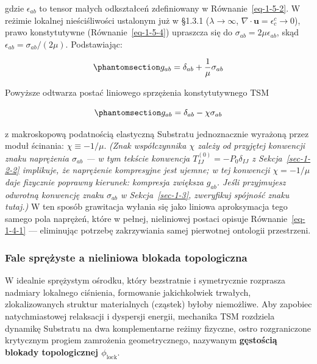 \documentclass[
  polish,
  letterpaper,
  DIV=11,
  numbers=noendperiod,
  oneside]{scrartcl}
\begin{document}
gdzie \(\epsilon_{ab}\) to tensor małych odkształceń zdefiniowany w
Równanie~\ref{eq-1-5-2}. W reżimie lokalnej nieściśliwości ustalonym już
w §1.3.1 (\(\lambda\to\infty\),
\(\nabla\cdot\mathbf{u}=\epsilon^c_c\to0\)), prawo konstytutywne
(Równanie~\ref{eq-1-5-4}) upraszcza się do
\(\sigma_{ab}=2\mu\epsilon_{ab}\), skąd
\(\epsilon_{ab}=\sigma_{ab}/(2\mu)\). Podstawiając:

\begin{equation}\protect\phantomsection\label{eq-1-5-9a}{g_{ab} = \delta_{ab} + \frac{1}{\mu}\sigma_{ab}}\end{equation}

Powyższe odtwarza postać liniowego sprzężenia konstytutywnego TSM

\begin{equation}\protect\phantomsection\label{eq-1-5-9b}{g_{ab} = \delta_{ab} - \chi\sigma_{ab}}\end{equation}

z makroskopową podatnością elastyczną Substratu jednoznacznie wyrażoną
przez moduł ścinania: \(\chi \equiv -1/\mu\). \emph{(Znak współczynnika
\(\chi\) zależy od przyjętej konwencji znaku naprężenia \(\sigma_{ab}\)
--- w tym tekście konwencja \(T^{(0)}_{IJ}=-P_0\delta_{IJ}\) z
Sekcja~\ref{sec-1-2-2} implikuje, że naprężenie kompresyjne jest ujemne;
w tej konwencji \(\chi=-1/\mu\) daje fizycznie poprawny kierunek:
kompresja zwiększa \(g_{ab}\). Jeśli przyjmujesz odwrotną konwencję
znaku \(\sigma_{ab}\) w Sekcja~\ref{sec-1-3}, zweryfikuj spójność znaku
tutaj.)} W ten sposób grawitacja wyłania się jako liniowa aproksymacja
tego samego pola naprężeń, które w pełnej, nieliniowej postaci opisuje
Równanie~\ref{eq-1-4-1} --- eliminując potrzebę zakrzywiania samej
pierwotnej ontologii przestrzeni.

\subsubsection{Fale sprężyste a nieliniowa blokada
topologiczna}\label{sec-1-5-2}

W idealnie sprężystym ośrodku, który bezstratnie i symetrycznie
rozprasza nadmiary lokalnego ciśnienia, formowanie jakichkolwiek
trwałych, zlokalizowanych struktur materialnych (cząstek) byłoby
niemożliwe. Aby zapobiec natychmiastowej relaksacji i dyspersji energii,
mechanika TSM rozdziela dynamikę Substratu na dwa komplementarne reżimy
fizyczne, ostro rozgraniczone krytycznym progiem zamrożenia
geometrycznego, nazywanym \textbf{gęstością blokady topologicznej
\(\phi_{\text{lock}}\)}.
\end{document}
